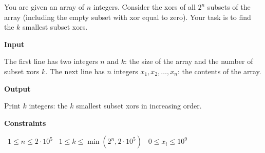 You are given an array of $n$ integers. Consider the xors of all $2^n$ subsets of the array (including the empty subset with xor equal to zero).
Your task is to find the $k$ smallest subset xors.

\vspace{0.3cm}\noindent\textbf{Input}

The first line has two integers $n$ and $k$: the size of the array and the number of subset xors $k$.
The next line has $n$ integers $x_1, x_2,\dots, x_n$: the contents of the array.

\vspace{0.3cm}\noindent\textbf{Output}

Print $k$ integers: the $k$ smallest subset xors in increasing order.

\vspace{0.3cm}\noindent\textbf{Constraints}

\textbullet\ $1 \le n \le 2 \cdot 10^5$
\textbullet\ $1 \le k \le \min(2^n, 2 \cdot 10^5)$
\textbullet\ $0 \le x_i \le 10^9$